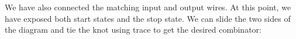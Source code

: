 \documentclass{llncs}
\begin{document}
{%


\begin{center}
\end{center}

We have also connected the matching input and output wires. At this point, we
have exposed both start states and the stop state. 
We can slide the two sides of the diagram and tie the knot using {{trace}} to
get the desired combinator:

\begin{center}
\end{center}


}
\end{document}
